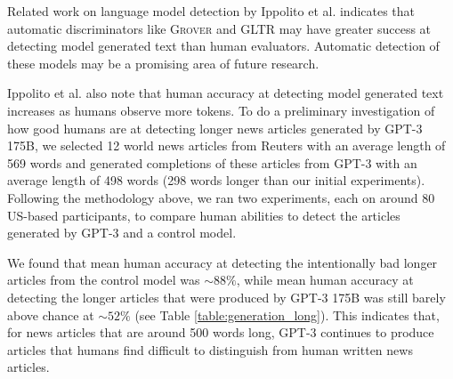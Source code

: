 


 
 Related work on language model detection by Ippolito et al. \cite{ippolito2019automatic} indicates that automatic discriminators like \textsc{Grover} \cite{zellers2019defending} and GLTR \cite{gehrmann2019gltr} may have greater success at detecting model generated text than human evaluators. Automatic detection of these models may be a promising area of future research.
 
Ippolito et al. \cite{ippolito2019automatic} also note that human accuracy at detecting model generated text increases as humans observe more tokens. To do a preliminary investigation of how good humans are at detecting longer news articles generated by GPT-3 175B, we selected 12 world news articles from Reuters with an average length of 569 words and generated completions of these articles from GPT-3 with an average length of 498 words (298 words longer than our initial experiments). Following the methodology above, we ran two experiments, each on around 80 US-based participants, to compare human abilities to detect the articles generated by GPT-3 and a control model.
 
 We found that mean human accuracy at detecting the intentionally bad longer articles from the control model was $\sim88\%$, while mean human accuracy at detecting the longer articles that were produced by GPT-3 175B was still barely above chance at $\sim52\%$ (see Table \ref{table:generation_long}). This indicates that, for news articles that are around 500 words long, GPT-3 continues to produce articles that humans find difficult to distinguish from human written news articles.
 
 